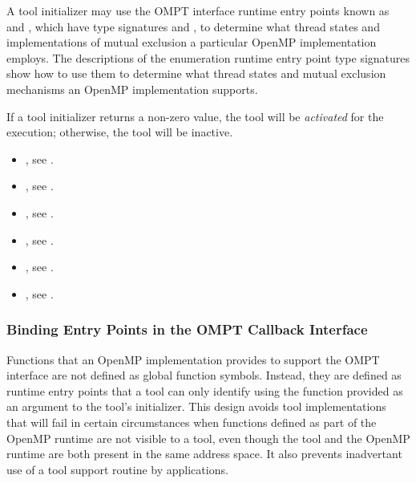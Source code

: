 A tool initializer may use the OMPT interface runtime
entry points known as  and
, which have type signatures
 and
, to determine what thread
states and implementations of mutual exclusion a particular OpenMP
implementation employs. The descriptions of the enumeration runtime entry point
type signatures show how to use them to determine what
thread states and mutual exclusion mechanisms an OpenMP implementation supports.

If a tool initializer returns a non-zero value, the tool will be
\emph{activated} for the execution; otherwise, the tool will be
inactive.

\crossreferences
\begin{itemize}
\item {}, see .
\item {}, see .
\item {}, see .
\item {}, see   .
\item {}, see .
\item {}, see .
\end{itemize}


\subsubsection{Binding Entry Points in the OMPT Callback Interface}
\label{sec:ompt-bind}

Functions that an OpenMP implementation provides to support the OMPT interface
are not defined as global function symbols. Instead, they are defined as runtime entry points 
that a tool can only identify using the  function provided as an
argument to the tool's initializer. This design avoids tool
implementations that
will fail in certain circumstances when functions defined as part of
the OpenMP runtime are not visible to a tool, even though the tool and
the OpenMP runtime are both present in the same address space.
It also prevents inadvertant use of a tool support routine by
applications.
 
